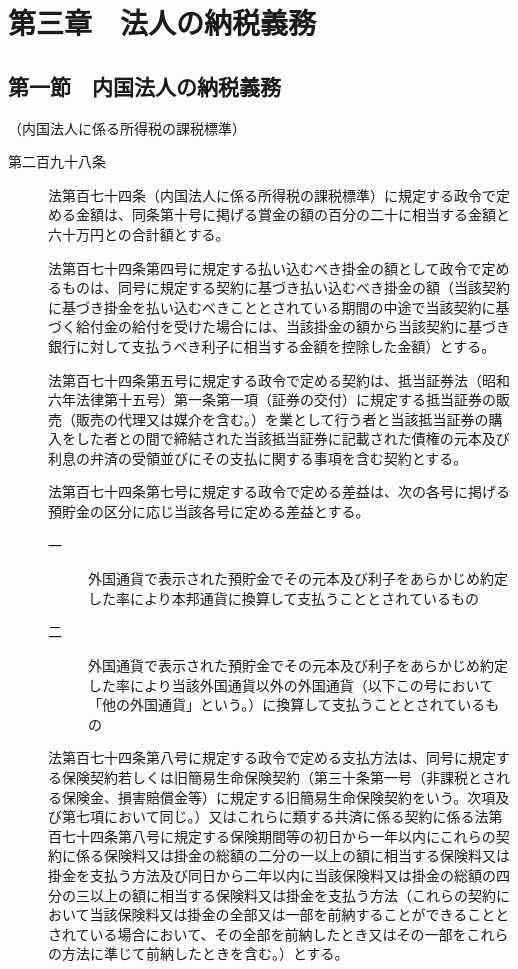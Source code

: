 \documentclass[twocolumn,a4j,10pt]{ltjtarticle}
\begin{document}
\section*{第三章　法人の納税義務}
\subsection*{第一節　内国法人の納税義務}
\noindent\hspace{10pt}（内国法人に係る所得税の課税標準）
\begin{description}
\item[第二百九十八条]法第百七十四条（内国法人に係る所得税の課税標準）に規定する政令で定める金額は、同条第十号に掲げる賞金の額の百分の二十に相当する金額と六十万円との合計額とする。
\item[]法第百七十四条第四号に規定する払い込むべき掛金の額として政令で定めるものは、同号に規定する契約に基づき払い込むべき掛金の額（当該契約に基づき掛金を払い込むべきこととされている期間の中途で当該契約に基づく給付金の給付を受けた場合には、当該掛金の額から当該契約に基づき銀行に対して支払うべき利子に相当する金額を控除した金額）とする。
\item[]法第百七十四条第五号に規定する政令で定める契約は、抵当証券法（昭和六年法律第十五号）第一条第一項（証券の交付）に規定する抵当証券の販売（販売の代理又は媒介を含む。）を業として行う者と当該抵当証券の購入をした者との間で締結された当該抵当証券に記載された債権の元本及び利息の弁済の受領並びにその支払に関する事項を含む契約とする。
\item[]法第百七十四条第七号に規定する政令で定める差益は、次の各号に掲げる預貯金の区分に応じ当該各号に定める差益とする。
\begin{description}
\item[一]外国通貨で表示された預貯金でその元本及び利子をあらかじめ約定した率により本邦通貨に換算して支払うこととされているもの
\item[二]外国通貨で表示された預貯金でその元本及び利子をあらかじめ約定した率により当該外国通貨以外の外国通貨（以下この号において「他の外国通貨」という。）に換算して支払うこととされているもの
\end{description}
\item[]法第百七十四条第八号に規定する政令で定める支払方法は、同号に規定する保険契約若しくは旧簡易生命保険契約（第三十条第一号（非課税とされる保険金、損害賠償金等）に規定する旧簡易生命保険契約をいう。次項及び第七項において同じ。）又はこれらに類する共済に係る契約に係る法第百七十四条第八号に規定する保険期間等の初日から一年以内にこれらの契約に係る保険料又は掛金の総額の二分の一以上の額に相当する保険料又は掛金を支払う方法及び同日から二年以内に当該保険料又は掛金の総額の四分の三以上の額に相当する保険料又は掛金を支払う方法（これらの契約において当該保険料又は掛金の全部又は一部を前納することができることとされている場合において、その全部を前納したとき又はその一部をこれらの方法に準じて前納したときを含む。）とする。

\end{description}
\end{document}

